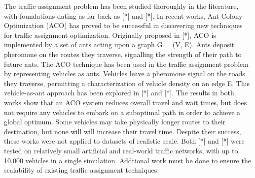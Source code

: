 \documentclass[conference]{IEEEtran}
\begin{document}
The traffic assignment problem has been studied thoroughly in the literature, with foundations dating as far back as [*] and [*]. In recent works, Ant Colony Optimization (ACO) has proved to be successful in discovering new techniques for traffic assignment optimization. Originally proposed in [*], ACO is implemented by a set of ants acting upon a graph G = (V, E). Ants deposit pheromone on the routes they traverse, signalling the strength of their path to future ants. The ACO technique has been used in the traffic assignment problem by representing vehicles as ants. Vehicles leave a pheromone signal on the roads they traverse, permitting a characterization of vehicle density on an edge E. This vehicle-as-ant approach has been explored in [*] and [*]. The results in both works show that an ACO system reduces overall travel and wait times, but does not require any vehicles to embark on a suboptimal path in order to achieve a global optimum. Some vehicles may take physically longer routes to their destination, but none will will increase their travel time. Despite their success, these works were not applied to datasets of realistic scale. Both [*] and [*] were tested on relatively small artificial and real-world traffic networks, with up to 10,000 vehicles in a single simulation. Addtional work must be done to ensure the scalability of existing traffic assignment techniques.
\end{document}
